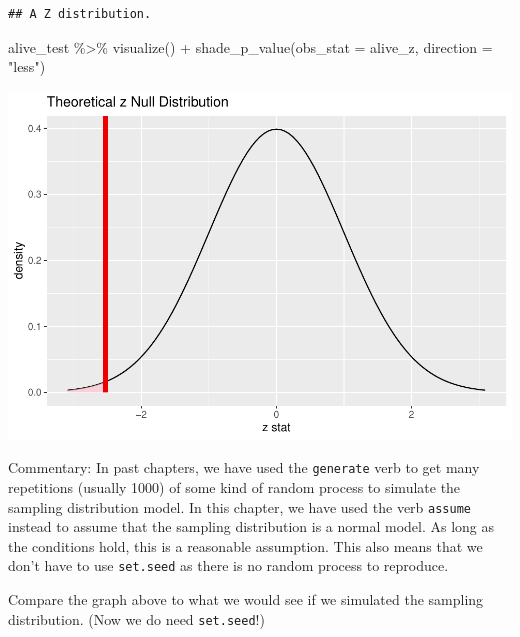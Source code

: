 \documentclass[
]{book}
\newenvironment{Shaded}{\begin{snugshade}}{\end{snugshade}}
\newcommand{\AttributeTok}[1]{\textcolor[rgb]{0.77,0.63,0.00}{#1}}
\newcommand{\FunctionTok}[1]{\textcolor[rgb]{0.00,0.00,0.00}{#1}}
\newcommand{\NormalTok}[1]{#1}
\newcommand{\SpecialCharTok}[1]{\textcolor[rgb]{0.00,0.00,0.00}{#1}}
\newcommand{\StringTok}[1]{\textcolor[rgb]{0.31,0.60,0.02}{#1}}
\begin{document}
\begin{verbatim}
## A Z distribution.
\end{verbatim}

\begin{Shaded}
\begin{Highlighting}[]
\NormalTok{alive\_test }\SpecialCharTok{\%\textgreater{}\%}
    \FunctionTok{visualize}\NormalTok{() }\SpecialCharTok{+}
    \FunctionTok{shade\_p\_value}\NormalTok{(}\AttributeTok{obs\_stat =}\NormalTok{ alive\_z, }\AttributeTok{direction =} \StringTok{"less"}\NormalTok{)}
\end{Highlighting}
\end{Shaded}

\includegraphics{intro_stats_files/figure-latex/unnamed-chunk-390-1.pdf}

Commentary: In past chapters, we have used the \texttt{generate} verb to get many repetitions (usually 1000) of some kind of random process to simulate the sampling distribution model. In this chapter, we have used the verb \texttt{assume} instead to assume that the sampling distribution is a normal model. As long as the conditions hold, this is a reasonable assumption. This also means that we don't have to use \texttt{set.seed} as there is no random process to reproduce.

Compare the graph above to what we would see if we simulated the sampling distribution. (Now we do need \texttt{set.seed}!)
\end{document}
